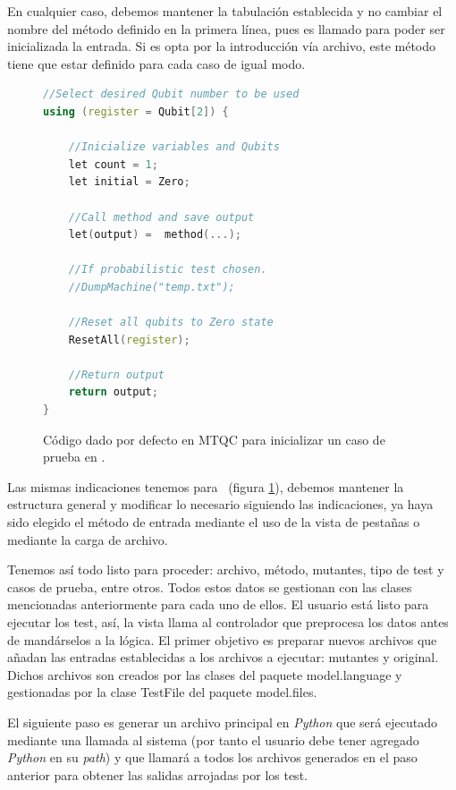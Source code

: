 En cualquier caso, debemos mantener la tabulación establecida y no cambiar el nombre del método definido en la primera línea, pues es llamado para poder ser inicializada la entrada. Si es opta por la introducción vía archivo, este método tiene que estar definido para cada caso de igual modo.

\begin{figure}[htb]
\begin{lstlisting}[language=c++]
//Select desired Qubit number to be used
using (register = Qubit[2]) {

	//Inicialize variables and Qubits
	let count = 1;
	let initial = Zero;

	//Call method and save output
	let(output) =  method(...);

	//If probabilistic test chosen.
	//DumpMachine("temp.txt");

	//Reset all qubits to Zero state
	ResetAll(register);

	//Return output
	return output;
}
\end{lstlisting}
\caption{Código dado por defecto en MTQC para inicializar un caso de prueba en \qsh.}
\label{fig:code4}
\end{figure}

Las mismas indicaciones tenemos para \qsh\ (figura \ref{fig:code4}), debemos mantener la estructura general y modificar lo necesario siguiendo las indicaciones, ya haya sido elegido el método de entrada mediante el uso de la vista de pestañas o mediante la carga de archivo.

Tenemos así todo listo para proceder: archivo, método, mutantes, tipo de test y casos de prueba, entre otros. Todos estos datos se gestionan con las clases mencionadas anteriormente para cada uno de ellos. El usuario está listo para ejecutar los test, así, la vista llama al controlador que preprocesa los datos antes de mandárselos a la lógica. El primer objetivo es preparar nuevos archivos que añadan las entradas establecidas a los archivos a ejecutar: mutantes y original. Dichos archivos son creados por las clases del paquete model.language y gestionadas por la clase TestFile del paquete model.files.

El siguiente paso es generar un archivo principal en \textit{Python} que será ejecutado mediante una llamada al sistema (por tanto el usuario debe tener agregado \textit{Python} en su \textit{path}) y que llamará a todos los archivos generados en el paso anterior para obtener las salidas arrojadas por los test.

